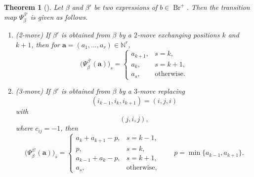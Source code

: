 \documentclass[12pt, reqno]{amsart}
\theoremstyle{plain}
\newtheorem{theorem}{Theorem}[section]
\theoremstyle{definition}
\numberwithin{equation}{section}
\newcommand{\Br}{{\operatorname{Br}}}
\begin{document}
\begin{theorem}[{\cite[Theorem~3.9]{bi2025cluster}}]\label{theo:braidmoves}
Let \(\beta\) and \(\beta'\) be two expressions of \(b\in\Br^+\).
Then the transition map \(\Psi_\beta^{\beta'}\) is given as follows.
\begin{enumerate}
    \item \emph{(2-move)}
    If \(\beta'\) is obtained from \(\beta\) by a \(2\)-move exchanging
    positions \(k\) and \(k+1\), then for
    \(\mathbf a=(a_1,\dots,a_r)\in\mathbb N^r\),
    \[
    \bigl(\Psi_\beta^{\beta'}(\mathbf a)\bigr)_s=
    \begin{cases}
        a_{k+1}, & s=k,\\
        a_k, & s=k+1,\\
        a_s, & \text{otherwise}.
    \end{cases}
    \]

    \item \emph{(3-move)}
    If \(\beta'\) is obtained from \(\beta\) by a \(3\)-move replacing
    \[
    (i_{k-1},i_k,i_{k+1})=(i,j,i)
    \]
    with
    \[
    (j,i,j),
    \]
    where \(c_{ij}=-1\), then
    \[
    \bigl(\Psi_\beta^{\beta'}(\mathbf a)\bigr)_s=
    \begin{cases}
        a_k+a_{k+1}-p, & s=k-1,\\
        p, & s=k,\\
        a_{k-1}+a_k-p, & s=k+1,\\
        a_s, & \text{otherwise},
    \end{cases}
    \qquad
    p=\min\{a_{k-1},a_{k+1}\}.
    \]
\end{enumerate}
\end{theorem}
\end{document}
